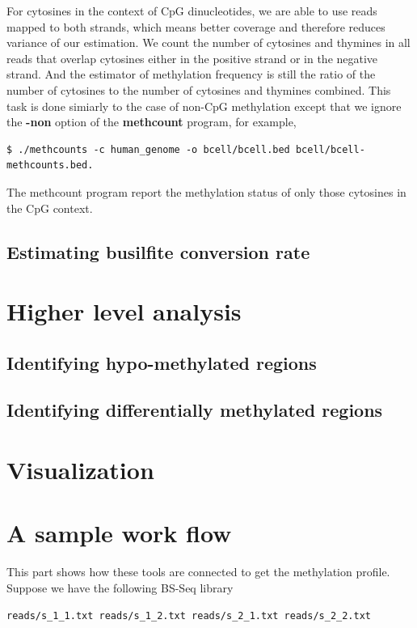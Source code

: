 \documentclass{article}
\begin{document}
For cytosines in the context of CpG dinucleotides, we are able to use
reads mapped to both strands, which means better coverage and
therefore reduces variance of our estimation. We count the number of
cytosines and thymines in all reads that overlap cytosines either in
the positive strand or in the negative strand. And the estimator of
methylation frequency is still the ratio of the number of cytosines to
the number of cytosines and thymines combined. This task is done
simiarly to the case of non-CpG methylation except that we ignore the
\textbf{-non} option of the \textbf{methcount} program, for example, 
\begin{verbatim}
$ ./methcounts -c human_genome -o bcell/bcell.bed bcell/bcell-methcounts.bed.  
\end{verbatim}
The methcount program report the methylation status of only those
cytosines in the CpG context. 


\subsection{Estimating busilfite conversion rate}
\label{sec:estim-busilf-conv}



\section{Higher level analysis}
\label{sec:high-level-analys}

\subsection{Identifying hypo-methylated regions}
\label{sec:ident-hypo-methyl}

\subsection{Identifying differentially methylated regions}
\label{sec:ident-diff-methyl}


\section{Visualization}
\label{sec:visualization}





\section{A sample work flow}
This part shows how these tools are connected to get the methylation
profile. Suppose we have the following BS-Seq library
\begin{verbatim}
reads/s_1_1.txt reads/s_1_2.txt reads/s_2_1.txt reads/s_2_2.txt
\end{verbatim}
\end{document}
